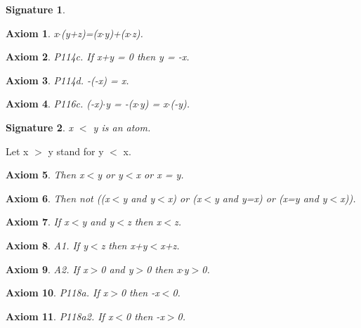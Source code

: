\documentclass{article}
\newenvironment{forthel}{\begin{leftbar}}{\end{leftbar}}
\newtheorem{axiom}{Axiom}
\newtheorem{signature}{Signature}
\begin{document}
\begin{forthel}
\begin{signature}
\end{signature}


\begin{axiom} x$\cdot$(y+z)=(x$\cdot$y)+(x$\cdot$z).

\end{axiom}


\begin{axiom} P114c. If x+y = 0 then y = -x.

\end{axiom}
\begin{axiom} P114d. -(-x) = x.

\end{axiom}

\begin{axiom} P116c. (-x)$\cdot$y = -(x$\cdot$y) = x$\cdot$(-y).

\end{axiom}




\begin{signature} x $<$ y is an atom.

\end{signature}
Let x $>$ y stand for y $<$ x.


\begin{axiom} Then x$<$y or y$<$x or x = y.

\end{axiom}
\begin{axiom} Then not ((x$<$y and y$<$x) or (x$<$y and y=x) or (x=y and y$<$x)).

\end{axiom}
\begin{axiom} If x$<$y and y$<$z then x$<$z.

\end{axiom}







\begin{axiom} A1. If y$<$z then x+y$<$x+z.

\end{axiom}
\begin{axiom} A2. If x$>$0 and y$>$0 then x$\cdot$y$>$0.

\end{axiom}

\begin{axiom} P118a. If x$>$0 then -x$<$0.

\end{axiom}
\begin{axiom} P118a2. If x$<$0 then -x$>$0.


\end{axiom}
\end{forthel}
\end{document}
